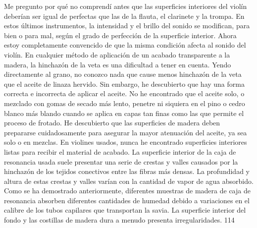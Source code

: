 Me pregunto por qué no comprendí antes que las superficies interiores del violín deberían ser igual de perfectas que las de la flauta, el clarinete y la trompa. En estos últimos instrumentos, la intensidad y el brillo del sonido se modifican, para bien o para mal, según el grado de perfección de la superficie interior. Ahora estoy completamente convencido de que la misma condición afecta al sonido del violín. En cualquier método de aplicación de un acabado transparente a la madera, la hinchazón de la veta es una dificultad a tener en cuenta. Yendo directamente al grano, no conozco nada que cause menos hinchazón de la veta que el aceite de linaza hervido. Sin embargo, he descubierto que hay una forma correcta e incorrecta de aplicar el aceite. No he encontrado que el aceite solo, o mezclado con gomas de secado más lento, penetre ni siquiera en el pino o cedro blanco más blando cuando se aplica en capas tan finas como las que permite el proceso de frotado. He descubierto que las superficies de madera deben prepararse cuidadosamente para asegurar la mayor atenuación del aceite, ya sea solo o en mezclas. En violines usados, nunca he encontrado superficies interiores listas para recibir el material de acabado. La superficie interior de la caja de resonancia usada suele presentar una serie de crestas y valles causados por la hinchazón de los tejidos conectivos entre las fibras más densas. La profundidad y altura de estas crestas y valles varían con la cantidad de vapor de agua absorbido. Como se ha demostrado anteriormente, diferentes muestras de madera de caja de resonancia absorben diferentes cantidades de humedad debido a variaciones en el calibre de los tubos capilares que transportan la savia. La superficie interior del fondo y las costillas de madera dura a menudo presenta irregularidades.
114

